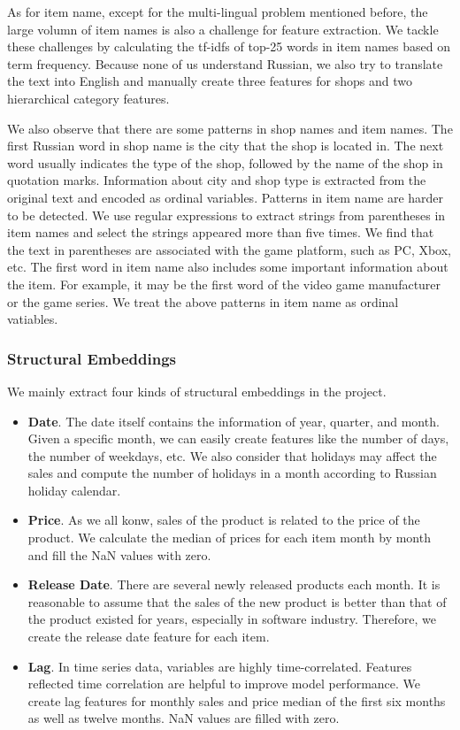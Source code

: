\documentclass{article}
\begin{document}
As for item name, except for the multi-lingual problem mentioned before, the large volumn of item names is also a challenge for feature extraction. We tackle these challenges by calculating the tf-idfs of top-25 words in item names based on term frequency. Because none of us understand Russian, we also try to translate the text into English and manually create three features for shops and two hierarchical category features.\par
We also observe that there are some patterns in shop names and item names. The first Russian word in shop name is the city that the shop is located in. The next word usually indicates the type of the shop, followed by the name of the shop in quotation marks. Information about city and shop type is extracted from the original text and encoded as ordinal variables. Patterns in item name are harder to be detected. We use regular expressions to extract strings from parentheses in item names and select the strings appeared more than five times. We find that the text in parentheses are associated with the game platform, such as PC, Xbox, etc. The first word in item name also includes some important information about the item. For example, it may be the first word of the video game manufacturer or the game series. We treat the above patterns in item name as ordinal vatiables.

\subsubsection{Structural Embeddings}
We mainly extract four kinds of structural embeddings in the project.
\begin{itemize}
    \item[] \textbf{Date}. The date itself contains the information of year, quarter, and month. Given a specific month, we can easily create features like the number of days, the number of weekdays, etc. We also consider that holidays may affect the sales and compute the number of holidays in a month according to Russian holiday calendar.
   \item[] \textbf{Price}. As we all konw, sales of the product is related to the price of the product. We calculate the median of prices for each item month by month and fill the NaN values with zero.
   \item[] \textbf{Release Date}. There are several newly released products each month. It is reasonable to assume that the sales of the new product is better than that of the product existed for years, especially in software industry. Therefore, we create the release date feature for each item.
   \item[] \textbf{Lag}. In time series data, variables are highly time-correlated. Features reflected time correlation are helpful to improve model performance. We create lag features for monthly sales and price median of the first six months as well as twelve months. NaN values are filled with zero.
\end{itemize}
\end{document}
